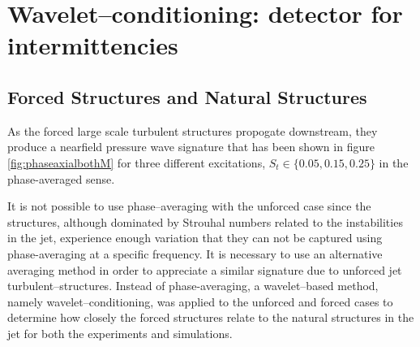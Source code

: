 \section{Wavelet--conditioning: detector for intermittencies}

\subsection{Forced Structures and Natural Structures}%
As the forced large scale turbulent structures propogate downstream, they produce a nearfield pressure wave signature that has been shown in figure \ref{fig:phaseaxialbothM} for three different excitations, $S_t \in \{ 0.05, 0.15, 0.25 \}$ in the phase-averaged sense. 

It is not possible to use phase--averaging with the unforced case since the structures, although dominated by Strouhal numbers related to the instabilities in the jet, experience enough variation that they can not be captured using phase-averaging at a specific frequency. 
It is necessary to use an alternative averaging method in order to appreciate a similar signature due to unforced jet turbulent--structures.
Instead of phase-averaging, a wavelet--based method, namely wavelet--conditioning, was applied to the unforced and forced cases to determine how closely the forced structures relate to the natural structures in the jet for both the experiments and simulations.


